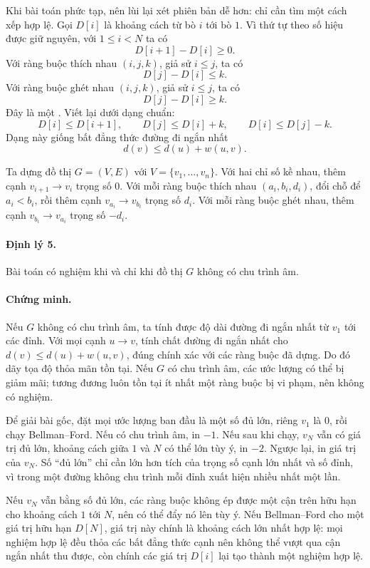 \documentclass[11pt]{article}
\begin{document}
Khi bài toán phức tạp, nên lùi lại xét phiên bản dễ hơn: chỉ cần tìm một cách
xếp hợp lệ. Gọi \(D[i]\) là khoảng cách từ bò \(i\) tới bò \(1\). Vì thứ tự
theo số hiệu được giữ nguyên, với \(1\le i<N\) ta có
\[
  D[i+1]-D[i]\ge 0.
\]
Với ràng buộc thích nhau \((i,j,k)\), giả sử \(i\le j\), ta có
\[
  D[j]-D[i]\le k.
\]
Với ràng buộc ghét nhau \((i,j,k)\), giả sử \(i\le j\), ta có
\[
  D[j]-D[i]\ge k.
\]
Đây là một . Viết lại dưới dạng chuẩn:
\[
  D[i]\le D[i+1],\qquad
  D[j]\le D[i]+k,\qquad
  D[i]\le D[j]-k.
\]
Dạng này giống bất đẳng thức đường đi ngắn nhất
\[
  d(v)\le d(u)+w(u,v).
\]

Ta dựng đồ thị \(G=(V,E)\) với \(V=\{v_1,\ldots,v_n\}\). Với hai chỉ số kề
nhau, thêm cạnh \(v_{i+1}\to v_i\) trọng số \(0\). Với mỗi ràng buộc thích
nhau \((a_i,b_i,d_i)\), đổi chỗ để \(a_i<b_i\), rồi thêm cạnh
\(v_{a_i}\to v_{b_i}\) trọng số \(d_i\). Với mỗi ràng buộc ghét nhau, thêm
cạnh \(v_{b_i}\to v_{a_i}\) trọng số \(-d_i\).

\paragraph{Định lý 5.}
Bài toán có nghiệm khi và chỉ khi đồ thị \(G\) không có chu trình âm.

\paragraph{Chứng minh.}
Nếu \(G\) không có chu trình âm, ta tính được độ dài đường đi ngắn nhất từ
\(v_1\) tới các đỉnh. Với mọi cạnh \(u\to v\), tính chất đường đi ngắn nhất
cho \(d(v)\le d(u)+w(u,v)\), đúng chính xác với các ràng buộc đã dựng. Do đó
dãy tọa độ thỏa mãn tồn tại. Nếu \(G\) có chu trình âm, các ước lượng có thể
bị giảm mãi; tương đương luôn tồn tại ít nhất một ràng buộc bị vi phạm, nên
không có nghiệm.

Để giải bài gốc, đặt mọi ước lượng ban đầu là một số đủ lớn, riêng \(v_1\) là
\(0\), rồi chạy Bellman--Ford. Nếu có chu trình âm, in \(-1\). Nếu sau khi
chạy, \(v_N\) vẫn có giá trị đủ lớn, khoảng cách giữa \(1\) và \(N\) có thể
lớn tùy ý, in \(-2\). Ngược lại, in giá trị của \(v_N\). Số ``đủ lớn'' chỉ cần
lớn hơn tích của trọng số cạnh lớn nhất và số đỉnh, vì trong một đường không
chu trình mỗi đỉnh xuất hiện nhiều nhất một lần.

Nếu \(v_N\) vẫn bằng số đủ lớn, các ràng buộc không ép được một cận trên hữu
hạn cho khoảng cách \(1\) tới \(N\), nên có thể đẩy nó lên tùy ý. Nếu
Bellman--Ford cho một giá trị hữu hạn \(D[N]\), giá trị này chính là khoảng
cách lớn nhất hợp lệ: mọi nghiệm hợp lệ đều thỏa các bất đẳng thức cạnh nên
không thể vượt qua cận ngắn nhất thu được, còn chính các giá trị \(D[i]\) lại
tạo thành một nghiệm hợp lệ.
\end{document}
